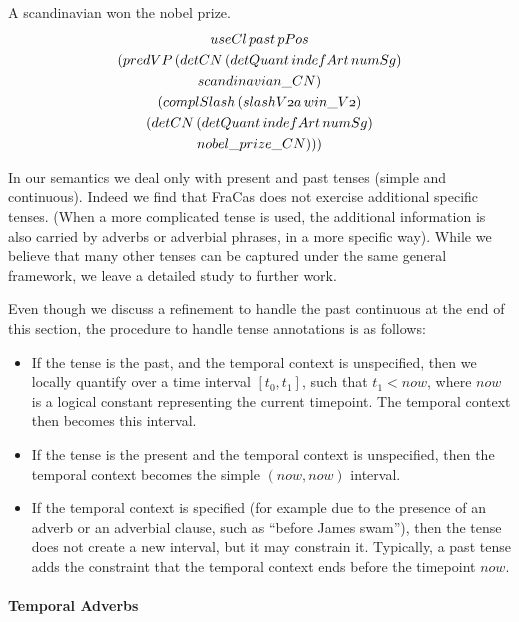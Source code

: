 \documentclass[a4paper,11pt]{article}
\newcommand\onelingex[1]{\begin{lingex}\item #1 \end{lingex}}
\begin{document}
\onelingex{A scandinavian won the nobel prize.\label{ex:nobel}
\\
{\small\begin{multline*}
\mathnormal{useCl}\, \mathnormal{past}\, \mathnormal{pPos}\\ (\mathnormal{predVP}\, (\mathnormal{detCN}\, (\mathnormal{detQuant}\, \mathnormal{indefArt}\, \mathnormal{numSg})\\ \mathnormal{scandinavian\_CN})\\ (\mathnormal{complSlash}\, (\mathnormal{slashV2a}\, \mathnormal{win\_V2})\\ (\mathnormal{detCN}\, (\mathnormal{detQuant}\, \mathnormal{indefArt}\, \mathnormal{numSg})\\ \mathnormal{nobel\_prize\_CN})))
\end{multline*}
}}
%
In our semantics we deal only with present and past tenses (simple and
continuous). Indeed we find that FraCas does not exercise additional
specific tenses. (When a more complicated tense is used, the
additional information is also carried by adverbs or adverbial
phrases, in a more specific way). While we believe that many other
tenses can be captured under the same general framework, we leave a
detailed study to further work.

Even though we discuss a refinement to handle the past continuous
at the end of this section, the procedure to handle tense annotations
is as follows:
\begin{itemize}
\item If the tense is the past, and the temporal context is
  unspecified, then we locally quantify over a time interval
  $[t_0,t_1]$, such that $t_1 < now$, where $now$ is a logical
  constant representing the current timepoint. The temporal context
  then becomes this interval.
\item If the tense is the present and the temporal context is
  unspecified, then the temporal context becomes the simple
  $(now,now)$ interval.
\item If the temporal context is specified (for example due to the presence of an adverb or an
  adverbial clause, such as ``before James swam''), then the tense does
  not create a new interval, but it may constrain it. Typically, a
  past tense adds the constraint that the temporal context ends before
  the timepoint $now$.
\end{itemize}

\paragraph{Temporal Adverbs}
\end{document}
